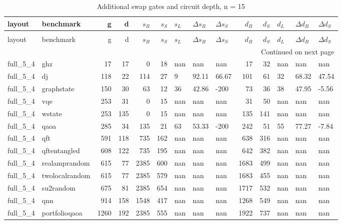 \begin{longtable}{llrrrrlllrrlll}
\caption{Additional swap gates and circuit depth, n = 15} \label{benchmark-table-15} \\
\toprule
layout & benchmark & g & d & $s_B$ & $s_S$ & $s_L$ & $\Delta s_B$ & $\Delta s_S$ & $d_B$ & $d_S$ & $d_L$ & $\Delta d_B$ & $\Delta d_S$ \\
\midrule
\endfirsthead
\caption[]{Additional swap gates and circuit depth, n = 15} \\
\toprule
layout & benchmark & g & d & $s_B$ & $s_S$ & $s_L$ & $\Delta s_B$ & $\Delta s_S$ & $d_B$ & $d_S$ & $d_L$ & $\Delta d_B$ & $\Delta d_S$ \\
\midrule
\endhead
\midrule
\multicolumn{14}{r}{Continued on next page} \\
\midrule
\endfoot
\bottomrule
\endlastfoot
full\_5\_4 & ghz & 17 & 17 & 0 & 18 & nan & nan & nan & 17 & 32 & nan & nan & nan \\
full\_5\_4 & dj & 118 & 22 & 114 & 27 & 9 & 92.11 & 66.67 & 101 & 61 & 32 & 68.32 & 47.54 \\
full\_5\_4 & graphstate & 150 & 30 & 63 & 12 & 36 & 42.86 & -200 & 73 & 36 & 38 & 47.95 & -5.56 \\
full\_5\_4 & vqe & 253 & 31 & 0 & 15 & nan & nan & nan & 31 & 50 & nan & nan & nan \\
full\_5\_4 & wstate & 253 & 135 & 0 & 15 & nan & nan & nan & 135 & 141 & nan & nan & nan \\
full\_5\_4 & qaoa & 285 & 34 & 135 & 21 & 63 & 53.33 & -200 & 242 & 51 & 55 & 77.27 & -7.84 \\
full\_5\_4 & qft & 591 & 118 & 735 & 162 & nan & nan & nan & 638 & 316 & nan & nan & nan \\
full\_5\_4 & qftentangled & 608 & 122 & 735 & 195 & nan & nan & nan & 642 & 382 & nan & nan & nan \\
full\_5\_4 & realamprandom & 615 & 77 & 2385 & 600 & nan & nan & nan & 1683 & 499 & nan & nan & nan \\
full\_5\_4 & twolocalrandom & 615 & 77 & 2385 & 579 & nan & nan & nan & 1683 & 455 & nan & nan & nan \\
full\_5\_4 & su2random & 675 & 81 & 2385 & 654 & nan & nan & nan & 1717 & 532 & nan & nan & nan \\
full\_5\_4 & qnn & 914 & 158 & 1548 & 417 & nan & nan & nan & 1268 & 549 & nan & nan & nan \\
full\_5\_4 & portfolioqaoa & 1260 & 192 & 2385 & 555 & nan & nan & nan & 1922 & 737 & nan & nan & nan \\

\end{longtable}
